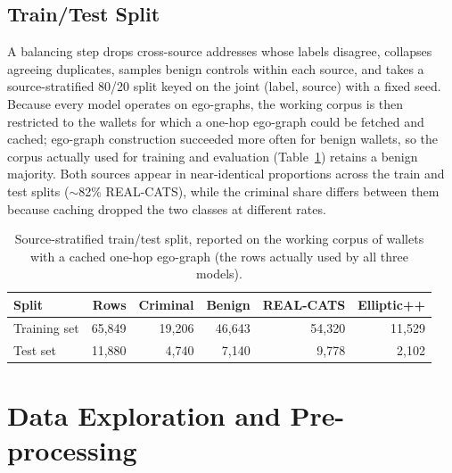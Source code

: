 \documentclass[12pt,a4paper,openany]{report}
\begin{document}
\section{Train/Test Split}
A balancing step drops cross-source addresses whose labels disagree, collapses agreeing
duplicates, samples benign controls within each source, and takes a source-stratified 80/20
split keyed on the joint (label, source) with a fixed seed. Because every model operates on
ego-graphs, the working corpus is then restricted to the wallets for which a one-hop ego-graph
could be fetched and cached; ego-graph construction succeeded more often for benign wallets, so
the corpus actually used for training and evaluation (Table~\ref{tab:split}) retains a benign
majority. Both sources appear in near-identical proportions across the train and test splits
($\sim$82\% REAL-CATS), while the criminal share differs between them because caching dropped the
two classes at different rates.

\begin{table}[H]
\centering\small
\caption{Source-stratified train/test split, reported on the working corpus of wallets with a
cached one-hop ego-graph (the rows actually used by all three models).}
\label{tab:split}
\begin{tabular}{lrrrrr}
\toprule
\textbf{Split} & \textbf{Rows} & \textbf{Criminal} & \textbf{Benign} & \textbf{REAL-CATS} & \textbf{Elliptic++} \\
\midrule
Training set & 65{,}849 & 19{,}206 & 46{,}643 & 54{,}320 & 11{,}529 \\
Test set     & 11{,}880 &  4{,}740 &  7{,}140 &  9{,}778 &  2{,}102 \\
\bottomrule
\end{tabular}
\end{table}

\chapter{Data Exploration and Pre-processing}\label{ch:eda}
\end{document}
